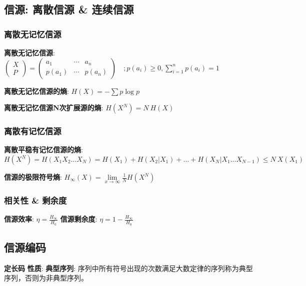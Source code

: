 \documentclass{article}
\begin{document}
            
    \subsection{信源: 离散信源 \& 连续信源}
        \subsubsection{离散无记忆信源}
            \textbf{离散无记忆信源}: $ \left(\begin{array}{l} X \\ P \end{array}\right)
                     = \left(\begin{array}{lll}
                        a_{1} & \cdots & a_{n} \\ p\left(a_{1}\right) & \cdots & p\left(a_{n}\right)
                    \end{array}\right) \quad;
                    p\left(a_{i}\right) \geqslant 0, \sum_{i=1}^{n} p\left(a_{i}\right)=1$
                
            \textbf{离散无记忆信源的熵}: $H(X) = -\sum p \log p$

            \textbf{离散无记忆信源N次扩展源的熵}: $H(X^N) = N\ H(X)$
            
        \subsubsection{离散有记忆信源}

            \textbf{离散平稳有记忆信源的熵}: $H(X^N) = H(X_1 X_2 ... X_N) = H(X_1) + H(X_2 | X_1) + ... + H(X_N | X_1 ... X_{N-1}) \le N\ X(X_1)$

            \textbf{信源的极限符号熵}: $H_\infty (X) = \lim\limits_{x \to \infty} \frac{1}{N} H(X^N)$

        \subsubsection{相关性 \& 剩余度}
            \textbf{信源效率}: $\eta = \frac{H_\infty}{H_0}$
            \textbf{信源剩余度}: $\eta = 1 - \frac{H_\infty}{H_0}$
            
    \subsection{信源编码}
        \textbf{定长码}
            \textbf{性质}:
                \textbf{典型序列}: 序列中所有符号出现的次数满足大数定律的序列称为典型序列，否则为非典型序列。
\end{document}

